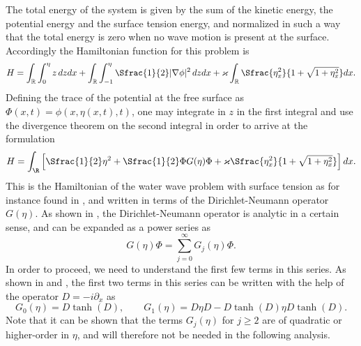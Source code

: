 The total energy of the system is given by the sum of the kinetic energy,
the potential energy and the surface tension energy,
and normalized in such a way that the total energy
is zero when no wave motion is present at the surface.
Accordingly the Hamiltonian function for this problem is
%
\[
	H = \int _{\mathbb R} \int_0^\eta z \, dz dx +
	\int _{\mathbb R} \int_{-1}^\eta \Sfrac{1}{2} |\nabla \phi|^2 \, dz dx
	+ \varkappa \int _{\mathbb R} \Sfrac{ \eta_x^2 }{ 1 + \sqrt{1 + \eta_x^2} } dx	
	.
\]
%
Defining the trace of the potential at the free surface as
$\Phi(x,t) = \phi(x,\eta(x,t),t)$,
one may integrate in $z$ in the first integral and use the divergence theorem 
on the second integral in order to arrive at the formulation
%
\begin{equation}
\label{Hamiltonian-eta-phi}
	H  = \int_\R \Big[ \Sfrac{1}{2} \eta^2 + \Sfrac{1}{2} \Phi G(\eta) \Phi
	+ \varkappa \Sfrac{ \eta_x^2 }{ 1 + \sqrt{1 + \eta_x^2} }	
	\Big] \, dx.
\end{equation}
%
This is the Hamiltonian of the water wave problem with surface tension
as for instance found in \cite{Alazard2011},
and written in terms of the Dirichlet-Neumann operator $G(\eta)$.
As shown in \cite{Nicholls2001}, the Dirichlet-Neumann operator is analytic
in a certain sense, and can be expanded as a power series as
%
\[
	G(\eta)\Phi = \sum_{j=0}^\infty G_j(\eta) \Phi
	.
\]
%
In order to proceed, we need to understand the first few terms in this series.
As shown in \cite{Craig1993} and \cite{Craig1994}, the first two terms in this series
can be written with the help of the operator $D = - i \partial_x$ as 
%
\[
	G_0(\eta)= D\tanh(D)
	, \qquad 
	G_1(\eta)= D\eta D - D\tanh(D) \eta D\tanh(D)
	. 
\]
%
%
Note that it can be shown that the terms $G_j(\eta)$ for $j\ge 2$ are of quadratic or
higher-order in $\eta$, and will therefore not be needed in the following
analysis.



